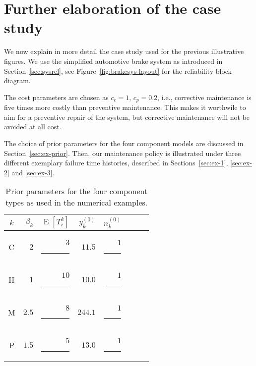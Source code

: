 \documentclass[authoryear]{elsarticle}
\newcommand{\uz}{^{(0)}} %
\newcommand{\E}{\operatorname{E}}
\def\ykz{y\uz_k}
\def\nkz{n\uz_k}
\begin{document}
\section{Further elaboration of the case study}
\label{sec:examples}

We now explain in more detail the case study used for the previous illustrative figures.
We use the simplified automotive brake system as introduced in Section~\ref{sec:sysrel},
see Figure~\ref{fig:brakesys-layout} for the reliability block diagram.

The cost parameters are chosen as $c_c = 1$, $c_p = 0.2$, %
i.e., corrective maintenance is five times more costly than preventive maintenance.
This makes it worthwile to aim for a preventive repair of the system,
but corrective maintenance will not be avoided at all cost.

The choice of prior parameters for the four component models are discussed in Section~\ref{sec:ex-prior}.
Then, our maintenance policy is illustrated under three different exemplary failure time histories,
described in Sections~\ref{sec:ex-1}, \ref{sec:ex-2} and \ref{sec:ex-3}.

\begin{table}
\centering
\begin{tabular}{crrrrrrr}
  \toprule
$k$ & $\beta_k$ & $\E[T_i^k]$ & $\ykz$ & $\nkz$ \\
  \midrule
C & $2  $ & $ 3$\rule{1.5ex}{0ex} & $ 11.5$ & $1$\rule{1ex}{0ex} \\
H & $1  $ & $10$\rule{1.5ex}{0ex} & $ 10.0$ & $1$\rule{1ex}{0ex} \\
M & $2.5$ & $ 8$\rule{1.5ex}{0ex} & $244.1$ & $1$\rule{1ex}{0ex} \\
P & $1.5$ & $ 5$\rule{1.5ex}{0ex} & $ 13.0$ & $1$\rule{1ex}{0ex} \\
  \bottomrule
\end{tabular}
\caption{Prior parameters for the four component types as used in the numerical examples.}
\label{tab:priorparams}
\end{table}
\end{document}

